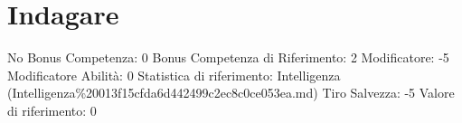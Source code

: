 \section{Indagare}\label{indagare}

\begin{description}
\tightlist
\item[Tags: ABI]
No Bonus Competenza: 0 Bonus Competenza di Riferimento: 2 Modificatore:
-5 Modificatore Abilità: 0 Statistica di riferimento: Intelligenza
(Intelligenza\%20013f15cfda6d442499c2ec8c0ce053ea.md) Tiro Salvezza: -5
Valore di riferimento: 0
\end{description}
